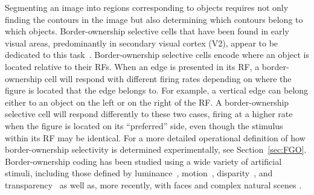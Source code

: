 Segmenting an image into regions corresponding to objects requires not only finding the contours in the image but also determining which contours belong to which objects.
%
Border-ownership selective cells that have been found in early visual areas, predominantly in secondary visual cortex (V2), appear to be dedicated to this task~\citep{Zhou_etal00}.
Border-ownership selective cells encode where an object is located relative to their RFs.  When an edge is presented in its RF, a border-ownership cell will respond with different firing rates depending on where the figure is located that the edge belongs to. For example, a vertical edge can belong either to an object on the left or on the right of the RF. A border-ownership selective cell will respond differently to these two cases, firing at a higher rate when the figure is located on its ``preferred'' side, even though the stimulus within its RF may be identical. For a more detailed operational definition of how border-ownership selectivity is determined experimentally, see Section~\ref{sec:FGO}. Border-ownership coding has been studied using a wide variety of artificial stimuli, including those defined by luminance~\citep{Zhou_etal00}, motion~\citep{vonderHeydt_etal03a}, disparity~\citep{Qiu_vonderHeydt05}, and transparency~\citep{Qiu_vonderHeydt07} as well as, more recently, with faces \citep{Hesse_Tsao16} and complex natural scenes \citep{Williford_vonderHeydt14}.

